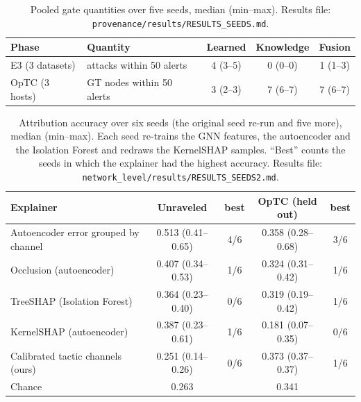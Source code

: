 \documentclass[acmlarge,screen,review]{acmart}
\begin{document}
\begin{table}[!htbp]
\centering\small
\caption{Pooled gate quantities over five seeds, median (min--max). Results file: \texttt{provenance/results/RESULTS\_SEEDS.md}.}
\label{tab:seeds}
\begin{tabular}{llccc}
\toprule
Phase & Quantity & Learned & Knowledge & Fusion \\
\midrule
E3 (3 datasets) & attacks within 50 alerts & 4 (3--5) & 0 (0--0) & 1 (1--3) \\
OpTC (3 hosts) & GT nodes within 50 alerts & 3 (2--3) & 7 (6--7) & 7 (6--7) \\
\bottomrule
\end{tabular}
\end{table}

\begin{table}[!htbp]
\centering\footnotesize
\caption{Attribution accuracy over six seeds (the original seed re-run and five more), median (min--max). Each seed
re-trains the GNN features, the autoencoder and the Isolation Forest and redraws the KernelSHAP samples. ``Best'' counts
the seeds in which the explainer had the highest accuracy. Results file: \texttt{network\_level/results/RESULTS\_SEEDS2.md}.}
\label{tab:rq3seeds}
\setlength{\tabcolsep}{3pt}
\begin{tabular}{@{}p{3.1cm}cccc@{}}
\toprule
Explainer & Unraveled & best & OpTC (held out) & best \\
\midrule
Autoencoder error grouped by channel & 0.513 (0.41--0.65) & 4/6 & 0.358 (0.28--0.68) & 3/6 \\
Occlusion (autoencoder) & 0.407 (0.34--0.53) & 1/6 & 0.324 (0.31--0.42) & 1/6 \\
TreeSHAP (Isolation Forest) & 0.364 (0.23--0.40) & 0/6 & 0.319 (0.19--0.42) & 1/6 \\
KernelSHAP (autoencoder) & 0.387 (0.23--0.61) & 1/6 & 0.181 (0.07--0.35) & 0/6 \\
Calibrated tactic channels (ours) & 0.251 (0.14--0.26) & 0/6 & 0.373 (0.37--0.37) & 1/6 \\
Chance & 0.263 & & 0.341 & \\
\bottomrule
\end{tabular}
\end{table}
\end{document}
